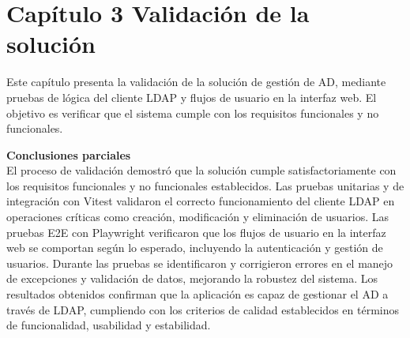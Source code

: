 \section{Capítulo 3 Validación de la solución}

Este capítulo presenta la validación de la solución de gestión de AD, mediante pruebas de lógica del cliente LDAP y flujos de usuario en la interfaz web. El objetivo es verificar que el sistema cumple con los requisitos funcionales y no funcionales.




\textbf{Conclusiones parciales}\\
El proceso de validación demostró que la solución cumple satisfactoriamente con los requisitos funcionales y no funcionales establecidos. Las pruebas unitarias y de integración con Vitest validaron el correcto funcionamiento del cliente LDAP en operaciones críticas como creación, modificación y eliminación de usuarios. Las pruebas E2E con Playwright verificaron que los flujos de usuario en la interfaz web se comportan según lo esperado, incluyendo la autenticación y gestión de usuarios. Durante las pruebas se identificaron y corrigieron errores en el manejo de excepciones y validación de datos, mejorando la robustez del sistema. Los resultados obtenidos confirman que la aplicación es capaz de gestionar el AD a través de LDAP, cumpliendo con los criterios de calidad establecidos en términos de funcionalidad, usabilidad y estabilidad.
